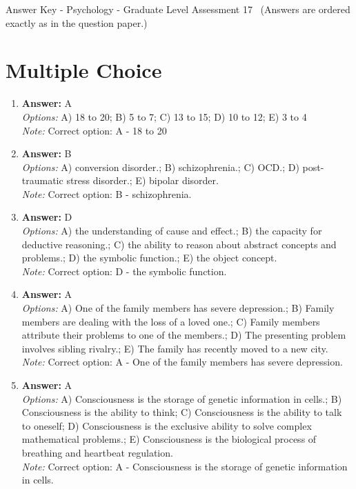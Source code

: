 \documentclass[12pt]{article}
\begin{document}
\begin{center}
Answer Key - Psychology - Graduate Level Assessment 17 \
\small (Answers are ordered exactly as in the question paper.)
\end{center}

\section*{Multiple Choice}
\begin{enumerate}[label=\arabic*.]
\item \textbf{Answer:} A
\\ \textit{Options:} A) 18 to 20; B) 5 to 7; C) 13 to 15; D) 10 to 12; E) 3 to 4
\\ \textit{Note:} Correct option: A - 18 to 20
\item \textbf{Answer:} B
\\ \textit{Options:} A) conversion disorder.; B) schizophrenia.; C) OCD.; D) post-traumatic stress disorder.; E) bipolar disorder.
\\ \textit{Note:} Correct option: B - schizophrenia.
\item \textbf{Answer:} D
\\ \textit{Options:} A) the understanding of cause and effect.; B) the capacity for deductive reasoning.; C) the ability to reason about abstract concepts and problems.; D) the symbolic function.; E) the object concept.
\\ \textit{Note:} Correct option: D - the symbolic function.
\item \textbf{Answer:} A
\\ \textit{Options:} A) One of the family members has severe depression.; B) Family members are dealing with the loss of a loved one.; C) Family members attribute their problems to one of the members.; D) The presenting problem involves sibling rivalry.; E) The family has recently moved to a new city.
\\ \textit{Note:} Correct option: A - One of the family members has severe depression.
\item \textbf{Answer:} A
\\ \textit{Options:} A) Consciousness is the storage of genetic information in cells.; B) Consciousness is the ability to think; C) Consciousness is the ability to talk to oneself; D) Consciousness is the exclusive ability to solve complex mathematical problems.; E) Consciousness is the biological process of breathing and heartbeat regulation.
\\ \textit{Note:} Correct option: A - Consciousness is the storage of genetic information in cells.
\end{enumerate}
\end{document}
